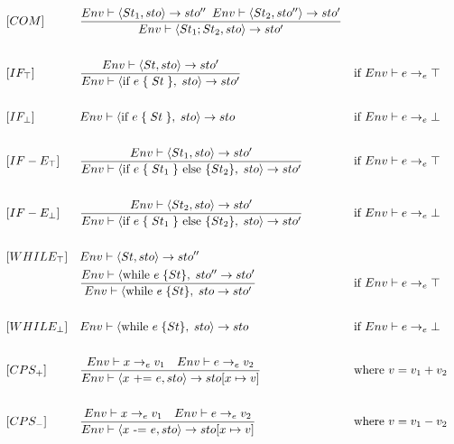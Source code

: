 \begin{align*}
&[COM] & &\frac{Env \vdash \langle St_1, sto \rangle \rightarrow sto^{\prime\prime} \enskip Env \vdash \langle St_2, sto^{\prime\prime} \rangle \rightarrow sto^\prime}{Env \vdash \langle St_1; St_2, sto \rangle \rightarrow sto^\prime}\\\\
%
&[IF_\top] & &\frac{Env \vdash \langle St, sto \rangle \rightarrow sto^\prime}{Env \vdash \langle \text{if } e\; \{\;St\;\},\; sto \rangle \rightarrow sto^\prime} & &\text{if } Env \vdash e \rightarrow_e \top\\\\
%
&[IF_\bot] & &Env \vdash \langle \text{if } e\; \{\;St\;\},\; sto \rangle \rightarrow sto & &\text{if } Env \vdash e \rightarrow_e \bot\\\\
%
&[IF-E_\top] & &\frac{Env \vdash \langle St_1, sto \rangle \rightarrow sto^\prime}{Env \vdash \langle \text{if } e\; \{\;St_1\;\} \text{ else } \{St_2\},\; sto \rangle \rightarrow sto^\prime} & &\text{if } Env \vdash e \rightarrow_e \top\\\\
%
&[IF-E_\bot] & &\frac{Env \vdash \langle St_2, sto \rangle \rightarrow sto^\prime}{Env \vdash \langle \text{if } e\; \{\;St_1\;\} \text{ else } \{St_2\},\; sto \rangle \rightarrow sto^\prime} & &\text{if } Env \vdash e \rightarrow_e \bot\\\\
%
&[WHILE_\top] & &Env \vdash \langle St, sto \rangle \rightarrow sto^{\prime\prime}\\
& & &\frac{Env \vdash \langle \text{while } e\; \{St\},\; sto^{\prime\prime} \rightarrow sto^\prime}{Env \vdash \langle \text{while } e\; \{St\},\; sto \rightarrow sto^\prime} & &\text{if } Env \vdash e \rightarrow_e \top\\\\
%
&[WHILE_\bot] & &Env \vdash \langle \text{while } e\; \{St\},\; sto \rangle \rightarrow sto & &\text{if } Env \vdash e \rightarrow_e \bot\\\\
&[CPS_+] & &\frac{Env \vdash x \rightarrow_e v_1 \quad Env \vdash e \rightarrow_e v_2}{Env \vdash \langle x \text{ += } e, sto \rangle \rightarrow sto[x \mapsto v]} & &\text{where } v = v_1 + v_2\\\\
%
&[CPS_-] & &\frac{Env \vdash x \rightarrow_e v_1 \quad Env \vdash e \rightarrow_e v_2}{Env \vdash \langle x \text{ -= } e, sto \rangle \rightarrow sto[x \mapsto v]} & &\text{where } v = v_1 - v_2\\\\

\end{align*}
